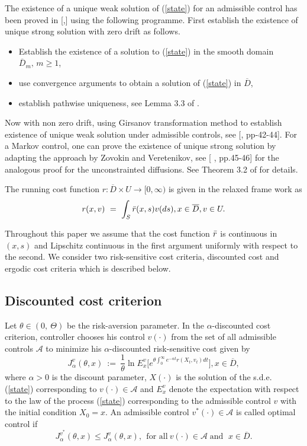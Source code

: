 \documentclass[11pt]{amsart}
\numberwithin{equation}{section}
\begin{document}
The existence
of a unique  weak solution of (\ref{state}) for an admissible control has been proved in [\cite{ghosh_suresh},\cite{lions_sznitman}] using the following programme. First establish the existence of unique
strong solution with zero drift as follows.
\begin{itemize}
\item Establish the existence of a solution to (\ref{state}) in the smooth domain $\overline{D}_m,
\, m \geq 1$,
\item  use convergence arguments to obtain a solution of (\ref{state}) in $\overline{D}$,
\item establish pathwise uniqueness, see Lemma 3.3 of \cite{Suresh_Bagchi}.
\end{itemize} 
Now with non zero drift, using Girsanov transformation method to establish existence of unique weak
solution under admissible controls, see [\cite{arapostathis_borkar_ghosh}, pp-42-44]. 
For a Markov control, one can prove the existence of unique strong
solution by adapting the approach by Zovokin and Veretenikov, 
see [ \cite{arapostathis_borkar_ghosh}, pp.45-46] for the analogous proof for the unconstrainted 
diffusions.  See Theorem 3.2 of \cite{Suresh_Bagchi} for details.



The running cost function $ r:\overline{ D }\times U\longrightarrow [0,\infty)$ is given 
in the relaxed frame work as 
\[
r(x, v) \ = \ \int_S \Bar{r}(x, s) v(ds),  x \in \overline{D}, v \in U.
\]

 Throughout this paper we assume that the cost function $\Bar{r}$ is  continuous in $(x,s)$ and  Lipschitz continuous in the first argument uniformly with respect to the second. 
We consider two risk-sensitive cost criteria, discounted cost and ergodic cost criteria which is described
below.




\subsection{Discounted cost criterion} Let $\theta \in (0, \ \Theta)$ be the risk-aversion parameter. In the $\alpha$-discounted cost criterion, controller chooses his control $v(\cdot)$ from the set of all admissible controls ${\mathcal A}$ to minimize his $\alpha$-discounted risk-sensitive cost given by 
\begin{equation}\label{discountedcost}
J^{v}_{\alpha}(\theta, x) \ := \ \dfrac{1}{\theta} \ln  E^{v}_x
\Big[ e^{\theta \int^{\infty}_0 e^{-\alpha t} r(X_t, v_t) dt} \Big] , x \in \overline{D}, 
\end{equation}
where $\alpha > 0$ is the discount parameter,  $X(\cdot)$ is the solution of the s.d.e. (\ref{state}) corresponding to $v(\cdot) \in  \mathcal{A}$ and $E^{v}_x$ denote the expectation with respect
to the law of the process (\ref{state}) corresponding to the admissible control $v$ with the initial condition $X_0 = x$.  An admissible control $v^*(\cdot)\in \mathcal A$ is called 
optimal control if
$$
J^{v^*}_{\alpha}(\theta, x) \leq J^{v}_{\alpha}(\theta, x), \ \ \mbox{for all} \ v(\cdot)\in \mathcal A \; \mbox{and } \; x \in \overline{D}.
$$
\end{document}
